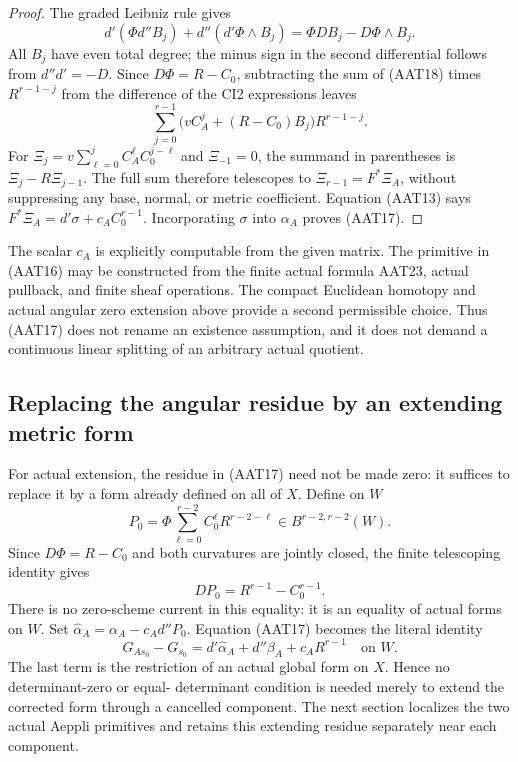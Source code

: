 \begin{proof}
The graded Leibniz rule gives
\[
 d'(\Phi d''B_j)+d''(d'\Phi\wedge B_j)
                         =\Phi DB_j-D\Phi\wedge B_j.
 \tag{AAT18}
\]
All $B_j$ have even total degree; the minus sign in
the second differential follows from $d''d'=-D$.
Since $D\Phi=R-C_0$, subtracting the sum of (AAT18)
times $R^{r-1-j}$ from the difference of the CI2
expressions leaves
\[
 \sum_{j=0}^{r-1}
       \bigl(v C_A^j+(R-C_0)B_j\bigr)R^{r-1-j}.
 \tag{AAT19}
\]
For $\Xi_j=v\sum_{\ell=0}^{j}C_A^\ell C_0^{j-\ell}$
and $\Xi_{-1}=0$, the summand in parentheses is
$\Xi_j-R\Xi_{j-1}$.  The full sum therefore telescopes
to $\Xi_{r-1}=F^*\Xi_A$, without suppressing any base,
normal, or metric coefficient.  Equation (AAT13) says
$F^*\Xi_A=d'\sigma+c_A C_0^{r-1}$.  Incorporating
$\sigma$ into $\alpha_A$ proves (AAT17).
\end{proof}

The scalar $c_A$ is explicitly computable from the given
matrix.  The primitive in (AAT16) may be constructed
from the finite actual formula AAT23, actual pullback,
and finite sheaf operations.  The compact Euclidean
homotopy and actual angular zero extension above
provide a second permissible choice.
Thus (AAT17) does not rename an existence assumption,
and it does not demand a continuous linear splitting of
an arbitrary actual quotient.

\subsection{Replacing the angular residue by an extending metric form}

For actual extension, the residue in (AAT17) need not be
made zero: it suffices to replace it by a form already
defined on all of $X$.  Define on $W$
\[
 P_0=\Phi\sum_{\ell=0}^{r-2}C_0^\ell R^{r-2-\ell}
                         \in B^{r-2,r-2}(W).
 \tag{AAT20}
\]
Since $D\Phi=R-C_0$ and both curvatures are jointly closed,
the finite telescoping identity gives
\[
                       DP_0=R^{r-1}-C_0^{r-1}.
 \tag{AAT21}
\]
There is no zero-scheme current in this equality: it is
an equality of actual forms on $W$.
Set $\widehat\alpha_A=\alpha_A-c_A d''P_0$.
Equation (AAT17) becomes the literal identity
\[
       G_{As_0}-G_{s_0}
          =d'\widehat\alpha_A+d''\beta_A+c_A R^{r-1}
                                             \quad\text{on }W.
 \tag{AAT22}
\]
The last term is the restriction of an actual global
form on $X$.  Hence no determinant-zero or equal-
determinant condition is needed merely to extend the
corrected form through a cancelled component.  The
next section localizes the two actual Aeppli primitives
and retains this extending residue separately near
each component.
